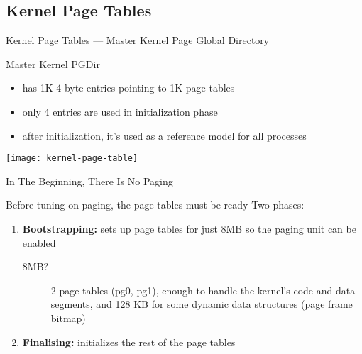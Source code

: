 \subsection{Kernel Page Tables}
\label{sec:kernel-page-tables}

\begin{frame}{Kernel Page Tables}{ --- Master Kernel Page Global Directory}
  \begin{varwidth}{.39\textwidth}
    \begin{block}{Master Kernel PGDir}
      \begin{itemize}
      \item has 1K 4-byte entries pointing to 1K page tables
      \item only 4 entries are used in initialization phase
      \item after initialization, it's used as a reference model for all processes
      \end{itemize}
    \end{block}
  \end{varwidth}\quad
  \begin{varwidth}{.5\textwidth}
    \begin{center}
      \texttt{[image: kernel-page-table]}
    \end{center}
  \end{varwidth}
\end{frame}

\begin{frame}{In The Beginning, There Is No Paging}
  \begin{block}{Before tuning on paging, the page tables must be ready}
    Two phases:
    \begin{enumerate}
    \item \textbf{Bootstrapping:} sets up page tables for just 8MB so the paging unit can
      be enabled
      \begin{description}
      \item[8MB?] 2 page tables (pg0, pg1), enough to handle the kernel's code and data
        segments, and 128 KB for some dynamic data structures (page frame bitmap)
      \end{description}
    \item \textbf{Finalising:} initializes the rest of the page tables
    \end{enumerate}
  \end{block}  
\end{frame}

